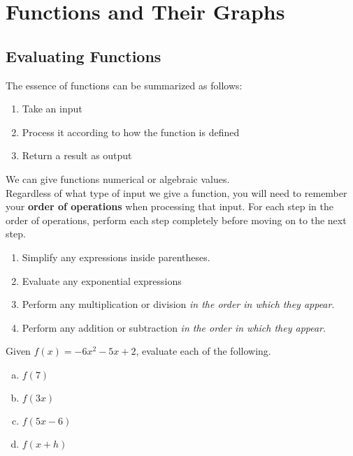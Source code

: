 \chapter{Functions and Their Graphs}

\section{Evaluating Functions}

The essence of functions can be summarized as follows:

\begin{enumerate}
    \item Take an input
    \item Process it according to how the function is defined
    \item Return a result as output
\end{enumerate}

We can give functions numerical or algebraic values. \\[18pt]

Regardless of what type of input we give a function, you will need to remember your {\color{violet}\textbf{order of operations}} when processing that input. For each step in the order of operations, perform each step completely before moving on to the next step.

\begin{enumerate}
    \item Simplify any expressions inside parentheses.
    \item Evaluate any exponential expressions
    \item Perform any multiplication or division \emph{in the order in which they appear}.
    \item Perform any addition or subtraction \emph{in the order in which they appear}.
\end{enumerate}

\vspace{18pt}

\begin{example}
Given $f(x) = -6x^2 - 5x + 2$, evaluate each of the following.
\begin{multicols}{4}
\begin{enumerate}[(a)]
    \item $f(7)$
    \item $f(3x)$
    \item $f(5x - 6)$
    \item $f(x + h)$
\end{enumerate}
\end{multicols}
\end{example}

